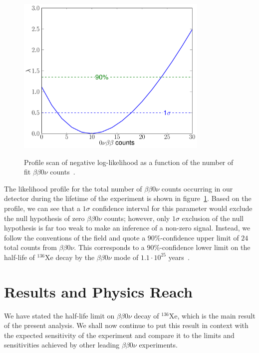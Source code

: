 \begin{figure}
\begin{center}
\includegraphics[keepaspectratio=true,height=3in]{0nubb_profile_frompaper.pdf}
\end{center}
\renewcommand{\baselinestretch}{1}
\small\normalsize
\begin{quote}
\caption{Profile scan of negative log-likelihood as a function of the number of fit $\beta\beta 0\nu$ counts~\cite{NewEXObb0nPaper_2014}.}
\label{fig:bb0nProfileFromPaper}
\end{quote}
\end{figure}
\renewcommand{\baselinestretch}{2}
\small\normalsize

The likelihood profile for the total number of $\beta\beta 0\nu$ counts occurring in our detector during the lifetime of the experiment is shown in figure~\ref{fig:bb0nProfileFromPaper}.  Based on the profile, we can see that a $1\sigma$ confidence interval for this parameter would exclude the null hypothesis of zero $\beta\beta 0\nu$ counts; however, only $1\sigma$ exclusion of the null hypothesis is far too weak to make an inference of a non-zero signal.  Instead, we follow the conventions of the field and quote a $90\%$-confidence upper limit of $24$ total counts from $\beta\beta 0\nu$.  This corresponds to a $90\%$-confidence lower limit on the half-life of $^{136}$Xe decay by the $\beta\beta 0\nu$ mode of $1.1 \cdot 10^{25}$ years~\cite{NewEXObb0nPaper_2014}.

\section{Results and Physics Reach}\label{sec:ResultResults}

We have stated the half-life limit on $\beta\beta 0\nu$ decay of $^{136}$Xe, which is the main result of the present analysis.  We shall now continue to put this result in context with the expected sensitivity of the experiment and compare it to the limits and sensitivities achieved by other leading $\beta\beta 0\nu$ experiments.

